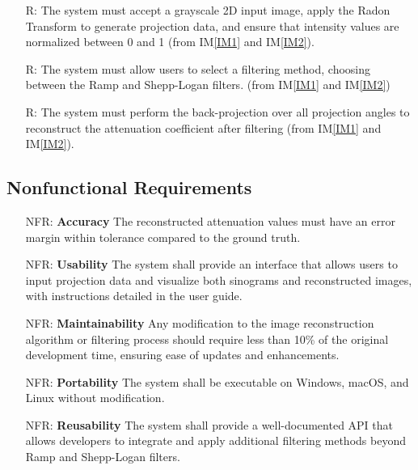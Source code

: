 \documentclass[12pt]{article}
\newcounter{reqnum} %
\newcounter{nfrnum} %
\begin{document}
\noindent \begin{itemize}

\item[R\refstepcounter{reqnum}\thereqnum \label{R1}:] The system must accept a
  grayscale 2D input image, apply the Radon Transform to generate projection
  data, and ensure that intensity values are normalized between 0 and 1 (from
  IM\ref{IM1} and IM\ref{IM2}).

\item[R\refstepcounter{reqnum}\thereqnum \label{R2}:] The system must allow users
  to select a filtering method, choosing between the Ramp and Shepp-Logan
  filters. (from IM\ref{IM1} and IM\ref{IM2})

\item[R\refstepcounter{reqnum}\thereqnum \label{R3}:] The system must perform the
  back-projection over all projection angles to reconstruct the attenuation
  coefficient after filtering (from IM\ref{IM1} and IM\ref{IM2}).

\end{itemize}

\subsection{Nonfunctional Requirements}
\noindent \begin{itemize}

\item[NFR\refstepcounter{nfrnum}\thenfrnum \label{NFR_Accuracy}:]
  \textbf{Accuracy} The reconstructed attenuation values must have an error margin
  within tolerance compared to the ground truth.

\item[NFR\refstepcounter{nfrnum}\thenfrnum \label{NFR_Usability}:] \textbf{Usability} The
  system shall provide an interface that allows users to input projection data
  and visualize both sinograms and reconstructed images, with instructions
  detailed in the user guide.

\item[NFR\refstepcounter{nfrnum}\thenfrnum \label{NFR_Maintainability}:]
  \textbf{Maintainability} Any modification to the image reconstruction
  algorithm or filtering process should require less than 10\% of the original
  development time, ensuring ease of updates and enhancements.

\item[NFR\refstepcounter{nfrnum}\thenfrnum \label{NFR_Portability}:]
  \textbf{Portability} The system shall be executable on Windows, macOS, and
  Linux without modification.

\item[NFR\refstepcounter{nfrnum}\thenfrnum \label{NFR_Reusability}:]
  \textbf{Reusability} The system shall provide a well-documented API that allows
  developers to integrate and apply additional filtering methods beyond Ramp and
  Shepp-Logan filters.
\end{itemize}
\end{document}
